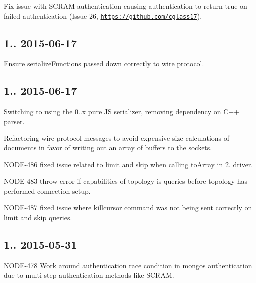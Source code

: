 \begin{DoxyItemize}
\item Fix issue with S\+C\+R\+AM authentication causing authentication to return true on failed authentication (Issue 26, \href{https://github.com/cglass17}{\tt https\+://github.\+com/cglass17}).
\end{DoxyItemize}

\subsection*{1.. 2015-\/06-\/17 }


\begin{DoxyItemize}
\item Ensure serialize\+Functions passed down correctly to wire protocol.
\end{DoxyItemize}

\subsection*{1.. 2015-\/06-\/17 }


\begin{DoxyItemize}
\item Switching to using the 0..\+x pure JS serializer, removing dependency on C++ parser.
\item Refactoring wire protocol messages to avoid expensive size calculations of documents in favor of writing out an array of buffers to the sockets.
\item N\+O\+D\+E-\/486 fixed issue related to limit and skip when calling to\+Array in 2. driver.
\item N\+O\+D\+E-\/483 throw error if capabilities of topology is queries before topology has performed connection setup.
\item N\+O\+D\+E-\/487 fixed issue where killcursor command was not being sent correctly on limit and skip queries.
\end{DoxyItemize}

\subsection*{1.. 2015-\/05-\/31 }


\begin{DoxyItemize}
\item N\+O\+D\+E-\/478 Work around authentication race condition in mongos authentication due to multi step authentication methods like S\+C\+R\+AM.
\end{DoxyItemize}

